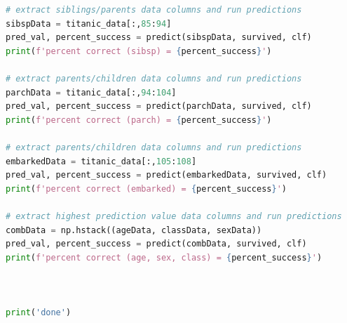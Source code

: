 \documentclass[11pt,a4paper]{article}
\begin{document}
\begin{lstlisting}[language=Python]
# extract siblings/parents data columns and run predictions
sibspData = titanic_data[:,85:94]
pred_val, percent_success = predict(sibspData, survived, clf)
print(f'percent correct (sibsp) = {percent_success}')

# extract parents/children data columns and run predictions
parchData = titanic_data[:,94:104]
pred_val, percent_success = predict(parchData, survived, clf)
print(f'percent correct (parch) = {percent_success}')

# extract parents/children data columns and run predictions
embarkedData = titanic_data[:,105:108]
pred_val, percent_success = predict(embarkedData, survived, clf)
print(f'percent correct (embarked) = {percent_success}')

# extract highest prediction value data columns and run predictions
combData = np.hstack((ageData, classData, sexData))
pred_val, percent_success = predict(combData, survived, clf)
print(f'percent correct (age, sex, class) = {percent_success}')



print('done')

\end{lstlisting}
\end{document}
